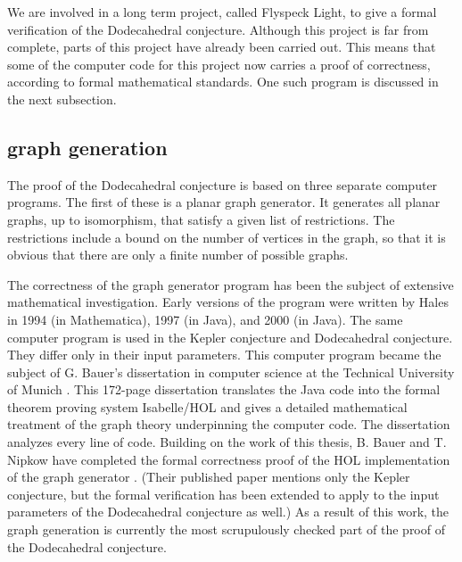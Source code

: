 We are involved in a long term project, 
called Flyspeck Light, to give a formal verification of the
Dodecahedral conjecture.  Although this project is far from
complete, parts of this project have already
been carried out.  This means that some of the computer code
for this project now carries a proof of correctness,
according to formal mathematical standards.  One such
program is discussed in the next subsection.






\subsection{graph generation}

The proof of the Dodecahedral conjecture is based on three separate
computer programs.  The first of these is a planar graph generator.
It generates all planar graphs, up to isomorphism, that satisfy
a given list of restrictions.  The restrictions include a bound on
the number of vertices in the graph, so that it is obvious that there are only a finite number of possible graphs.

The correctness of the graph generator program has been the 
subject of extensive
mathematical investigation.  Early versions of the program were
written by Hales in 1994 (in Mathematica), 1997 (in Java), and 2000 (in Java).  The same computer program is used in the Kepler conjecture
and Dodecahedral conjecture.  They differ only in their input parameters.
This computer program became the subject of  G. Bauer's
dissertation in computer science at the Technical University of Munich
\cite{Bauer}.
This 172-page dissertation translates the Java code into the
formal theorem proving system Isabelle/HOL and gives a detailed 
mathematical treatment of the graph theory underpinning the
computer code.  The dissertation analyzes every line of code.  
Building on the work of this thesis, B. Bauer
and T. Nipkow have completed the formal correctness proof of the HOL implementation
of the graph generator \cite{BN06}.  (Their published paper mentions
only the Kepler conjecture, but the formal verification 
has been extended to
apply to the input parameters of the Dodecahedral conjecture as well.)
As a result of this work, the graph generation is currently the
most scrupulously checked part of the proof of the Dodecahedral
conjecture.

